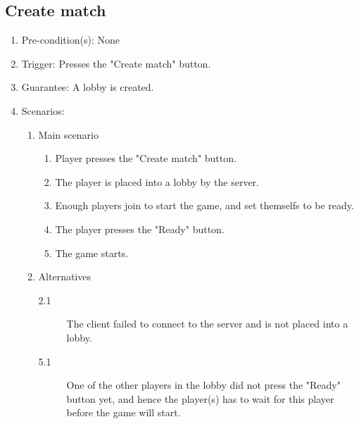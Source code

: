 \documentclass[a4paper,twoside,11pt]{article}
\begin{document}
\subsection*{Create match}
\begin{enumerate}
\item Pre-condition(s): None
\item Trigger: Presses the "Create match" button.
\item Guarantee: A lobby is created.
\item Scenarios: 
	\begin{enumerate}
	\item Main scenario
		\begin{enumerate}[1)]
		\item Player presses the "Create match" button.
		\item The player is placed into a lobby by the server.
		\item Enough players join to start the game, and set themselfs 			to be ready.
		\item The player presses the "Ready" button.
		\item The game starts.
		\end{enumerate}
	\item Alternatives
		\begin{description}
		\item[2.1] The client failed to connect to the server and is 			not placed into a lobby.
		\item[5.1] One of the other players in the lobby did not press 			the "Ready" button yet, and hence the player(s) has to wait for 			this player before the game will start.
		\end{description}
	\end{enumerate}
\end{enumerate}
\end{document}
